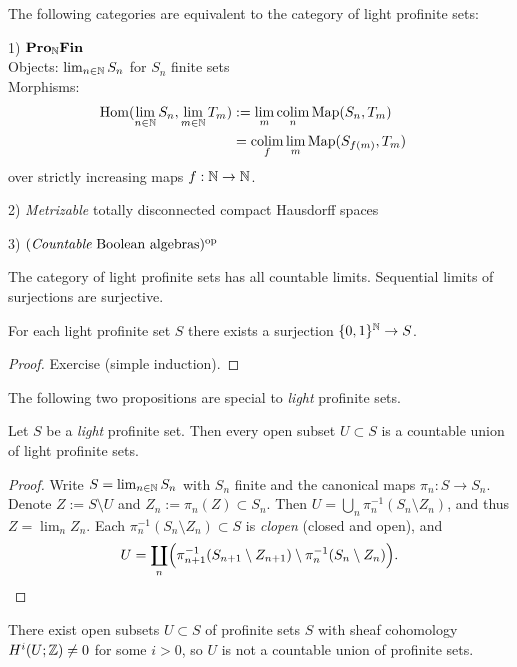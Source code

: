 \documentclass{notes}
\begin{document}
\begin{prop}
The following categories are equivalent to the category of light
profinite sets:

1) $\text{\bf Pro}_{{\mathbb{N}}}\text{\bf Fin}$ \\
Objects: $\lim_{n\in{\mathbb{N}}}S_n$ for $S_n$ finite sets
\\
Morphisms: 
\begin{align*}
  \mathrm{Hom}(\lim_{n\in{\mathbb{N}}}S_n,\lim_{m\in{\mathbb{N}}}T_m)
  &:= \lim_m\operatorname*{colim}_n{\rm Map}(S_n,T_m) \cr
  &= \operatorname*{colim}_f\lim_m{\rm Map}(S_{f(m)},T_m)
\end{align*}
over strictly increasing maps $f:{\mathbb{N}}\to{\mathbb{N}}$.
  
2) {\em Metrizable} totally disconnected compact Hausdorff spaces

3) $(\text{{\em Countable} Boolean algebras})^{\rm op}$
\end{prop}

\begin{prop}
The category of light profinite sets has all countable
limits. Sequential limits of surjections are surjective. 
\end{prop}

\begin{prop}
For each light profinite set $S$ there exists a surjection
$\{0,1\}^{\mathbb{N}}\to S$. 
\end{prop}

\begin{proof}
Exercise (simple induction).
\end{proof}

The following two propositions are special to {\em light} profinite
sets. 

\begin{prop}
Let $S$ be a {\em light} profinite set. Then every open subset $U\subset S$
is a countable union of light profinite sets. 
\end{prop}

\begin{proof}
Write $S=\lim_{n\in{\mathbb{N}}}S_n$ with $S_n$ finite and the canonical maps
$\pi_n:S\to S_n$. Denote $Z:=S\setminus U$ and $Z_n:=\pi_n(Z)\subset S_n$.
Then $U=\bigcup_n\pi_n^{-1}(S_n\setminus Z_n)$, and thus $Z=\lim_nZ_n$. 
Each $\pi_n^{-1}(S_n\setminus Z_n)\subset S$ is {\em clopen} (closed
and open), and
$$
  U = \coprod_n\Bigl(\pi_{n+1}^{-1}(S_{n+1}\setminus Z_{n+1})\setminus
  \pi_n^{-1}(S_n\setminus Z_n)\Bigr).
$$
\end{proof}

\begin{rem}
There exist open subsets $U\subset S$ of profinite sets $S$ with
sheaf cohomology $H^i(U;{\mathbb{Z}})\neq 0$ for some $i>0$, so $U$ is not 
a countable union of profinite sets.
\end{rem}
\end{document}
